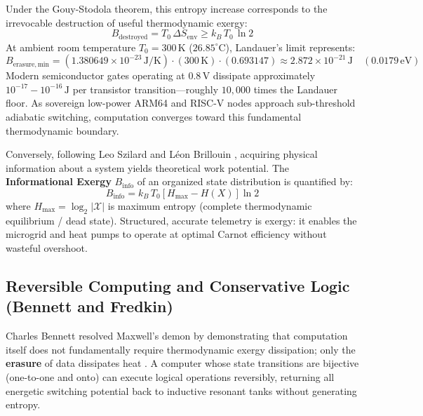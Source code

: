 Under the Gouy-Stodola theorem, this entropy increase corresponds to the irrevocable destruction of useful thermodynamic exergy:
\begin{equation}
B_{\mathrm{destroyed}} = T_0 \, \Delta S_{\mathrm{env}} \ge k_B \, T_0 \, \ln 2
\label{eq:landauer_bound}
\end{equation}
At ambient room temperature $T_0 = 300\,\mathrm{K}$ ($26.85^\circ\mathrm{C}$), Landauer's limit represents:
\begin{equation}
B_{\mathrm{erasure, min}} = (1.380649 \times 10^{-23}\,\mathrm{J/K}) \cdot (300\,\mathrm{K}) \cdot (0.693147) \approx 2.872 \times 10^{-21}\,\mathrm{J} \quad (0.0179\,\mathrm{eV})
\label{eq:landauer_numerical}
\end{equation}
Modern semiconductor gates operating at $0.8\,\mathrm{V}$ dissipate approximately $10^{-17} - 10^{-16}\,\mathrm{J}$ per transistor transition---roughly $10{,}000$ times the Landauer floor. As sovereign low-power ARM64 and RISC-V nodes approach sub-threshold adiabatic switching, computation converges toward this fundamental thermodynamic boundary.

Conversely, following Leo Szilard and L{\'e}on Brillouin \cite{brillouin2013science}, acquiring physical information about a system yields theoretical work potential. The \textbf{Informational Exergy} $B_{\mathrm{info}}$ of an organized state distribution is quantified by:
\begin{equation}
B_{\mathrm{info}} = k_B \, T_0 \left[ H_{\max} - H(X) \right] \ln 2
\label{eq:informational_exergy}
\end{equation}
where $H_{\max} = \log_2 |\mathcal{X}|$ is maximum entropy (complete thermodynamic equilibrium / dead state). Structured, accurate telemetry is exergy: it enables the microgrid and heat pumps to operate at optimal Carnot efficiency without wasteful overshoot.

\subsection{Reversible Computing and Conservative Logic (Bennett and Fredkin)}
Charles Bennett resolved Maxwell's demon by demonstrating that computation itself does not fundamentally require thermodynamic exergy dissipation; only the \textbf{erasure} of data dissipates heat \cite{bennett1982thermodynamics}. A computer whose state transitions are bijective (one-to-one and onto) can execute logical operations reversibly, returning all energetic switching potential back to inductive resonant tanks without generating entropy.


